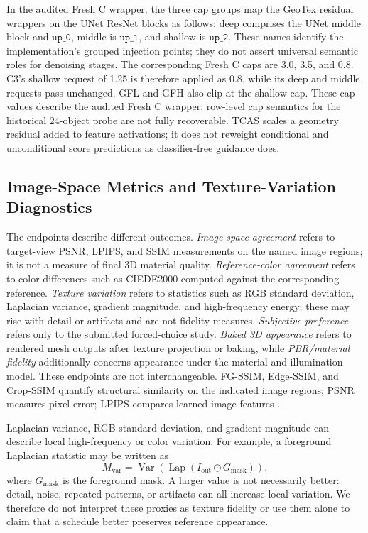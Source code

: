\documentclass[times,twocolumn,final]{elsarticle}
\begin{document}
In the audited Fresh C wrapper, the three cap groups map the GeoTex residual wrappers on the UNet ResNet blocks as follows: deep comprises the UNet middle block and $\texttt{up\_0}$, middle is $\texttt{up\_1}$, and shallow is $\texttt{up\_2}$. These names identify the implementation's grouped injection points; they do not assert universal semantic roles for denoising stages. The corresponding Fresh C caps are 3.0, 3.5, and 0.8. C3's shallow request of 1.25 is therefore applied as 0.8, while its deep and middle requests pass unchanged. GFL and GFH also clip at the shallow cap. These cap values describe the audited Fresh C wrapper; row-level cap semantics for the historical 24-object probe are not fully recoverable. TCAS scales a geometry residual added to feature activations; it does not reweight conditional and unconditional score predictions as classifier-free guidance does.

\subsection{Image-Space Metrics and Texture-Variation Diagnostics}
\label{subsec:metrics}

The endpoints describe different outcomes. \emph{Image-space agreement} refers to target-view PSNR, LPIPS, and SSIM measurements on the named image regions; it is not a measure of final 3D material quality. \emph{Reference-color agreement} refers to color differences such as CIEDE2000 computed against the corresponding reference. \emph{Texture variation} refers to statistics such as RGB standard deviation, Laplacian variance, gradient magnitude, and high-frequency energy; these may rise with detail or artifacts and are not fidelity measures. \emph{Subjective preference} refers only to the submitted forced-choice study. \emph{Baked 3D appearance} refers to rendered mesh outputs after texture projection or baking, while \emph{PBR/material fidelity} additionally concerns appearance under the material and illumination model. These endpoints are not interchangeable. FG-SSIM, Edge-SSIM, and Crop-SSIM quantify structural similarity on the indicated image regions; PSNR measures pixel error; LPIPS compares learned image features \cite{wang2004ssim,zhang2018lpips}.

Laplacian variance, RGB standard deviation, and gradient magnitude can describe local high-frequency or color variation. For example, a foreground Laplacian statistic may be written as
\begin{equation}
M_{\mathrm{var}}=\operatorname{Var}\!\left(\operatorname{Lap}(I_{\mathrm{out}}\odot G_{\mathrm{mask}})\right),
\end{equation}
where $G_{\mathrm{mask}}$ is the foreground mask. A larger value is not necessarily better: detail, noise, repeated patterns, or artifacts can all increase local variation. We therefore do not interpret these proxies as texture fidelity or use them alone to claim that a schedule better preserves reference appearance.
\end{document}
